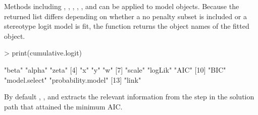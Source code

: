 \documentclass[article, shortclass, nojss]{jss}
\begin{document}
Methods including , , , , , and  can be applied to  model objects. Because the returned list differs depending on whether a no penalty subset is included or a stereotype logit model is fit, the  function returns the object names of the fitted object. 
\begin{Schunk}
\begin{Sinput}
> print(cumulative.logit)
\end{Sinput}
\begin{Soutput}
 [1] "beta"              "alpha"             "zeta"             
 [4] "x"                 "y"                 "w"                
 [7] "scale"             "logLik"            "AIC"              
[10] "BIC"               "model.select"      "probability.model"
[13] "link"             
\end{Soutput}
\end{Schunk}
By default , , and  extracts the relevant information from the step in the solution path that attained the minimum AIC.
\end{document}

